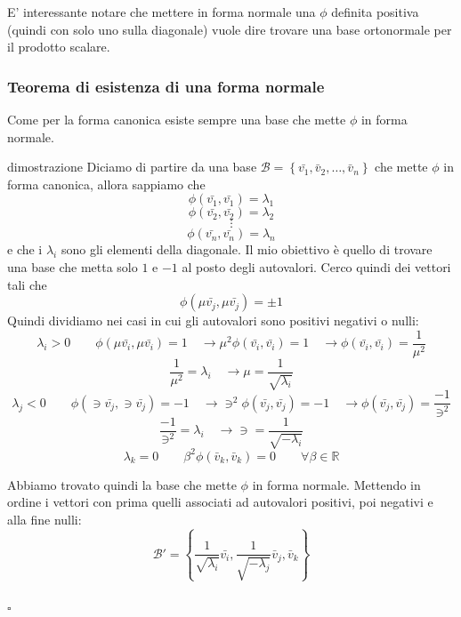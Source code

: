 \documentclass[x11names]{article}
\newcommand*{\QEDB}{\null\nobreak\hfill\ensuremath{\square}}%
\begin{document}
\noindent
E' interessante notare che mettere in forma normale una $\phi$ definita positiva (quindi con solo uno sulla diagonale) vuole dire trovare una base ortonormale per il prodotto scalare.

\begin{center}
	\colorbox{myred}{\begin{minipage}{5.75in}
			\begin{redes}{}
				\subsubsection{Teorema di esistenza di una forma normale}
				Come per la forma canonica esiste sempre una base che mette $\phi$ in forma normale.
			\end{redes}
	\end{minipage}}        
\end{center}


\begin{es}{dimostrazione}
	Diciamo di partire da una base $\mathcal{B} = \left\{\bar{v_{1}},\bar{v}_{2},\dots,\bar{v}_{n}\right\}$ che mette $\phi$ in forma canonica, allora sappiamo che 
	\[
	\phi(\bar{v_{1}},\bar{v_{1}}) = \lambda_1
	\]
	\[
	\phi(\bar{v_{2}},\bar{v_{2}}) = \lambda_2
	\]
	\[
	\vdots
	\]
	\[
	\phi(\bar{v_{n}},\bar{v_{n}}) = \lambda_n
	\]
	e che i $\lambda_i$ sono gli elementi della diagonale. Il mio obiettivo è quello di trovare una base che metta solo $1$ e $-1$ al posto degli autovalori. Cerco quindi dei vettori tali che
	\[
	\phi(\mu\bar{ v_{j}},\mu\bar{ v_{j}}) = \pm 1
	\]
	Quindi dividiamo nei casi in cui gli autovalori sono positivi negativi o nulli:
	\[
	\lambda_i > 0 \qquad  \phi(\mu\bar{v_{i}},\mu\bar{v_{i}}) =  1 \quad \to \mu^2\phi(\bar{v_{i}},\bar{v_{i}}) =  1 \quad \to \phi(\bar{v_{i}},\bar{v_{i}}) =  \frac{1}{\mu^2}
	\]
	\[
	\frac{1}{\mu^2} = \lambda_i \quad \to \mu = \frac{1}{\sqrt{\lambda_i}}
	\]
	\[
	\lambda_j < 0 \qquad  \phi(\ni\bar{v_{j}},\ni\bar{v_{j}}) =  -1 \quad \to \ni^2\phi(\bar{v_{j}},\bar{v_{j}}) =  -1 \quad \to \phi(\bar{v_{j}},\bar{v_{j}}) =  \frac{-1}{\ni^2}
	\]
	\[
	\frac{-1}{\ni^2} = \lambda_i \quad \to \ni = \frac{1}{\sqrt{-\lambda_i}}
	\]
	\[
	\lambda_k = 0 \qquad \beta^2\phi(\bar{v}_{k},\bar{v}_{k}) = 0 \qquad \forall \beta \in \mathbb{R}
	\]
	
	Abbiamo trovato quindi la base che mette $\phi$ in forma normale. Mettendo in ordine i vettori con prima quelli associati ad autovalori positivi, poi negativi e alla fine nulli:
	\[
	\mathcal{B}' = \left\{\frac{1}{\sqrt{\lambda_i}}\bar{v_{i}},\frac{1}{\sqrt{-\lambda_j}}\bar{v}_{j},\bar{v}_{k}\right\}
	\]
	\\
	\QEDB
\end{es}
\end{document}
